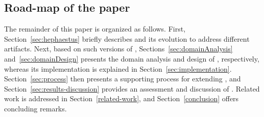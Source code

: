 
\subsection*{Road-map of the paper}

The remainder of this paper is organized as follows. First, Section~\ref{sec:hephaestus} briefly describes \hp{} and its evolution to address different artifacts. Next, based on such versions of \hp, Sections~\ref{sec:domainAnalysis} and~\ref{sec:domainDesign} presents the domain analysis and design of \hpl, respectively, whereas its implementation is explained in Section~\ref{sec:implementation}. Section~\ref{sec:process} then presents a supporting process for extending \hpl, and  Section~\ref{sec:results-discussion} provides an assessment and discussion of \hpl. Related work is addressed in Section~\ref{related-work}, and Section~\ref{conclusion} offers concluding remarks.

